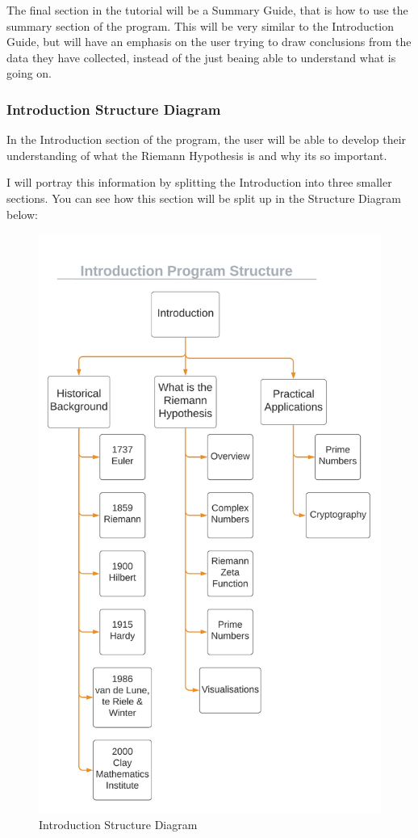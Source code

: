 \documentclass{article}
\begin{document}
The final section in the tutorial will be a Summary Guide, that is how to use the summary section of the program. This will be very similar to the Introduction Guide, but will have an emphasis on the user trying to draw conclusions from the data they have collected, instead of the just beaing able to understand what is going on.
\clearpage
\subsubsection{Introduction Structure Diagram}
In the Introduction section of the program, the user will be able to develop their understanding of what the Riemann Hypothesis is and why its so important.

I will portray this information by splitting the Introduction into three smaller sections. You can see how this section will be split up in the Structure Diagram below:

\begin{figure}[h]
    \centering
    \captionsetup{justification=centering}
    \includegraphics[scale=0.385]{introduction-structure-diagram}
    \caption{Introduction Structure Diagram}
\end{figure}
\end{document}
